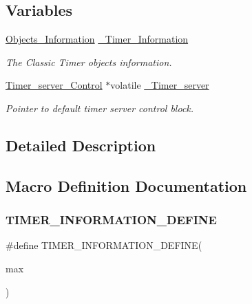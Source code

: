 \subsection*{Variables}
\begin{DoxyCompactItemize}
\item 
\mbox{\label{group__ClassicTimerImpl_gaeeffc0bb18f8574cf8977f92fd5c77d7}} 
\mbox{\hyperlink{structObjects__Information}{Objects\+\_\+\+Information}} \mbox{\hyperlink{group__ClassicTimerImpl_gaeeffc0bb18f8574cf8977f92fd5c77d7}{\+\_\+\+Timer\+\_\+\+Information}}
\begin{DoxyCompactList}\small\item\em The Classic Timer objects information. \end{DoxyCompactList}\item 
\mbox{\hyperlink{structTimer__server__Control}{Timer\+\_\+server\+\_\+\+Control}} $\ast$volatile \mbox{\hyperlink{group__ClassicTimerImpl_ga22a1cf7a5c39d7c8ea2ec3764ddb88fa}{\+\_\+\+Timer\+\_\+server}}
\begin{DoxyCompactList}\small\item\em Pointer to default timer server control block. \end{DoxyCompactList}\end{DoxyCompactItemize}


\subsection{Detailed Description}


\subsection{Macro Definition Documentation}
\mbox{\label{group__ClassicTimerImpl_gacd5bc085aebf83583143639317d97c4e}} 
\subsubsection{\texorpdfstring{TIMER\_INFORMATION\_DEFINE}{TIMER\_INFORMATION\_DEFINE}}
{\footnotesize\ttfamily \#define T\+I\+M\+E\+R\+\_\+\+I\+N\+F\+O\+R\+M\+A\+T\+I\+O\+N\+\_\+\+D\+E\+F\+I\+NE(\begin{DoxyParamCaption}\item[{}]{max }\end{DoxyParamCaption})}

